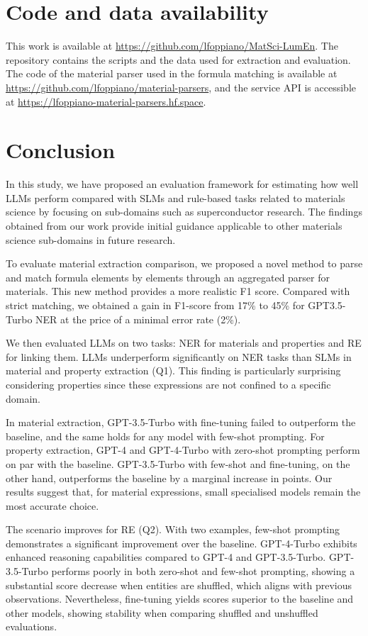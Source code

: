 \section{Code and data availability}
This work is available at \url{https://github.com/lfoppiano/MatSci-LumEn}. The repository contains the scripts and the data used for extraction and evaluation. 
The code of the material parser used in the formula matching is available at \url{https://github.com/lfoppiano/material-parsers}, and the service API is accessible at \url{https://lfoppiano-material-parsers.hf.space}. 

\section{Conclusion}

In this study, we have proposed an evaluation framework for estimating how well LLMs perform compared with SLMs and rule-based tasks related to materials science by focusing on sub-domains such as superconductor research. The findings obtained from our work provide initial guidance applicable to other materials science sub-domains in future research.

To evaluate material extraction comparison, we proposed a novel method to parse and match formula elements by elements through an aggregated parser for materials. 
This new method provides a more realistic F1 score. Compared with strict matching, we obtained a gain in F1-score from 17\% to 45\% for GPT3.5-Turbo NER at the price of a minimal error rate (2\%). 

We then evaluated LLMs on two tasks: NER for materials and properties and RE for linking them. LLMs underperform significantly on NER tasks than SLMs in material and property extraction (Q1). This finding is particularly surprising considering properties since these expressions are not confined to a specific domain.

In material extraction, GPT-3.5-Turbo with fine-tuning failed to outperform the baseline, and the same holds for any model with few-shot prompting. 
For property extraction, GPT-4 and GPT-4-Turbo with zero-shot prompting perform on par with the baseline. GPT-3.5-Turbo with few-shot and fine-tuning, on the other hand, outperforms the baseline by a marginal increase in points.
Our results suggest that, for material expressions, small specialised models remain the most accurate choice.

The scenario improves for RE (Q2).
With two examples, few-shot prompting demonstrates a significant improvement over the baseline.
GPT-4-Turbo exhibits enhanced reasoning capabilities compared to GPT-4 and GPT-3.5-Turbo.
GPT-3.5-Turbo performs poorly in both zero-shot and few-shot prompting, showing a substantial score decrease when entities are shuffled, which aligns with previous observations.
Nevertheless, fine-tuning yields scores superior to the baseline and other models, showing stability when comparing shuffled and unshuffled evaluations.

